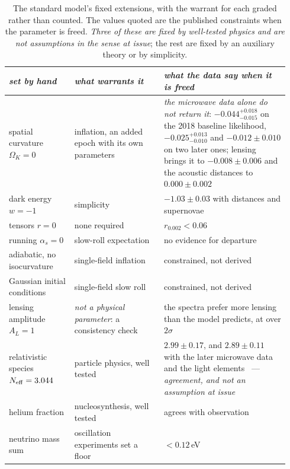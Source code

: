 \documentclass[11pt,a4paper]{article}
\theoremstyle{plain}
\theoremstyle{definition}
\begin{document}
\begin{table}[t]
\centering\small
\caption{The standard model's fixed extensions, with the warrant for each graded rather than counted. The
values quoted are the published constraints when the parameter is freed. \emph{Three of these are fixed by
well-tested physics and are not assumptions in the sense at issue}; the rest are fixed by an auxiliary theory
or by simplicity.}\label{tab:assumed}
\begin{tabular}{@{}p{0.22\linewidth}p{0.30\linewidth}p{0.42\linewidth}@{}}
\hline
\emph{set by hand} & \emph{what warrants it} & \emph{what the data say when it is freed} \\
\hline
spatial curvature $\Omega_K=0$ & inflation, an added epoch with its own parameters & \emph{the microwave data
alone do not return it}: $-0.044^{+0.018}_{-0.015}$ on the 2018 baseline likelihood, $-0.025^{+0.013}_{-0.010}$
and $-0.012\pm0.010$ on two later ones; lensing brings it to $-0.008\pm0.006$ and the acoustic distances to
$0.000\pm0.002$~\cite{Planck2018VI,RosenbergPR4,TristramPR4} \\
dark energy $w=-1$ & simplicity & $-1.03\pm0.03$ with distances and supernovae \\
tensors $r=0$ & none required & $r_{0.002}<0.06$ \\
running $\alpha_s=0$ & slow-roll expectation & no evidence for departure \\
adiabatic, no isocurvature & single-field inflation & constrained, not derived \\
Gaussian initial conditions & single-field slow roll & constrained, not derived \\
lensing amplitude $A_L=1$ & \emph{not a physical parameter}: a consistency check & the spectra prefer more
lensing than the model predicts, at over $2\sigma$ \\
\hline
relativistic species $N_{\rm eff}=3.044$ & particle physics, well tested & $2.99\pm0.17$, and $2.89\pm0.11$ with
the later microwave data and the light elements~\cite{ACTDR6ext} --- \emph{agreement, and not an assumption at issue} \\
helium fraction & nucleosynthesis, well tested & agrees with observation \\
neutrino mass sum & oscillation experiments set a floor & $<0.12$\,eV \\
\hline
\end{tabular}
\end{table}
\end{document}
